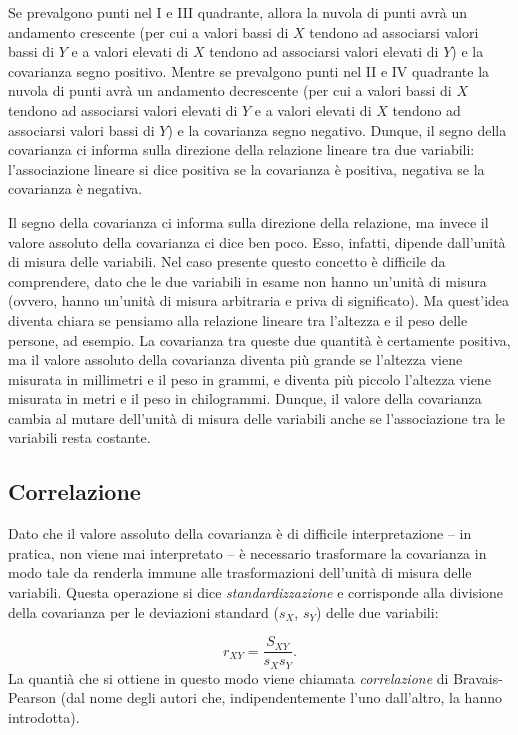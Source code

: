 Se prevalgono punti nel I e III quadrante, allora la nuvola di punti avrà un andamento crescente (per cui a valori bassi di $X$ tendono ad associarsi valori bassi di $Y$ e a valori elevati di $X$ tendono ad associarsi valori elevati di $Y$) e la covarianza segno positivo.
Mentre se prevalgono punti nel II e IV quadrante la nuvola di punti avrà un andamento decrescente (per cui a valori bassi di $X$ tendono ad associarsi valori elevati di $Y$ e a valori elevati di $X$ tendono ad associarsi valori bassi di $Y$) e la covarianza segno negativo. 
Dunque, il segno della covarianza ci informa sulla direzione della relazione lineare tra due variabili: l'associazione lineare si dice positiva se la covarianza è positiva, negativa se la covarianza è negativa.

Il segno della covarianza ci informa sulla direzione della relazione, ma invece il valore assoluto della covarianza ci dice ben poco.
Esso, infatti, dipende dall'unità di misura delle  variabili.
Nel caso presente questo concetto è difficile da comprendere, dato che le due variabili in esame non hanno un'unità di misura (ovvero, hanno un'unità di misura arbitraria e priva di significato).
Ma quest'idea diventa chiara se pensiamo alla relazione lineare tra l'altezza e il peso delle persone, ad esempio.
La covarianza tra queste due quantità è certamente positiva, ma il valore assoluto della covarianza diventa più grande se l'altezza viene misurata in millimetri e il peso in grammi, e diventa più piccolo l'altezza viene misurata in metri e il peso in chilogrammi.
Dunque, il valore della covarianza cambia al mutare dell'unità di misura delle variabili anche se l'associazione tra le variabili resta costante.


\subsection{Correlazione}

Dato che il valore assoluto della covarianza è di difficile interpretazione -- in pratica, non viene mai interpretato -- è necessario trasformare la covarianza in modo tale da renderla immune alle trasformazioni dell'unità di misura delle variabili.
Questa operazione si dice \emph{standardizzazione} e corrisponde alla divisione della covarianza per le deviazioni standard ($s_X$, $s_Y$) delle due variabili:

\begin{equation}
r_{XY} = \frac{S_{XY}}{s_X s_Y}.
\end{equation}
La quantià che si ottiene in questo modo viene chiamata \emph{correlazione} di Bravais-Pearson (dal nome degli autori che, indipendentemente l'uno dall'altro, la hanno introdotta).

